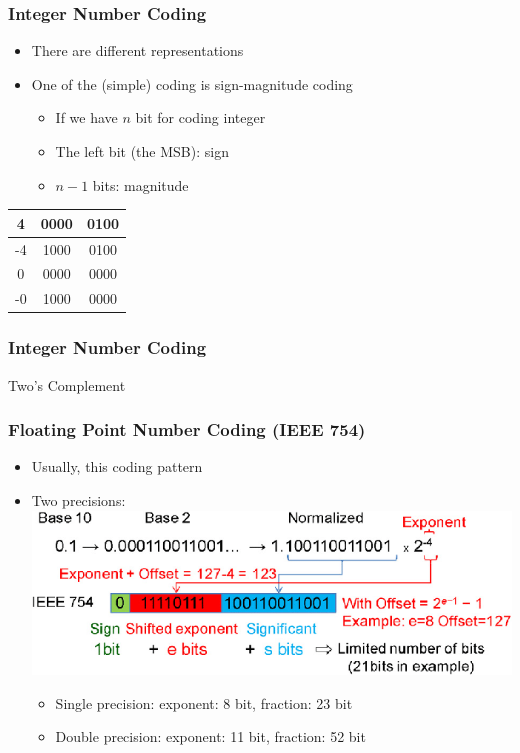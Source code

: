 \documentclass{../c-lecture}
\begin{document}
\begin{frame}
  \frametitle{Integer Number Coding}
  \begin{itemize}
    \item There are different representations
    \item One of the (simple) coding is sign-magnitude coding
    \begin{itemize}
      \item If we have $n$ bit for coding integer
      \item The left bit (the MSB): sign
      \item $n-1$ bits: magnitude
    \end{itemize}
  \end{itemize}
  \begin{table}
    \begin{tabular}{ccc}
      \toprule
      4 & 0000 & 0100 \\
      \midrule
      -4 & 1000 & 0100 \\
      \midrule
      0 & 0000 & 0000 \\
      \midrule
      -0 & 1000 & 0000 \\
      \bottomrule
    \end{tabular}
  \end{table}
\end{frame}

\begin{frame}
  \frametitle{Integer Number Coding}
  Two's Complement
\end{frame}

\begin{frame}
  \frametitle{Floating Point Number Coding (IEEE 754)}
  \begin{itemize}
    \item Usually, this coding pattern
    \item Two precisions:
    \includegraphics[width=\textwidth]{./img/ieee-754.png}
    \begin{itemize}
      \item Single precision: exponent: 8 bit, fraction: 23 bit
      \item Double precision: exponent: 11 bit, fraction: 52 bit
    \end{itemize}
  \end{itemize}
\end{frame}
\end{document}
